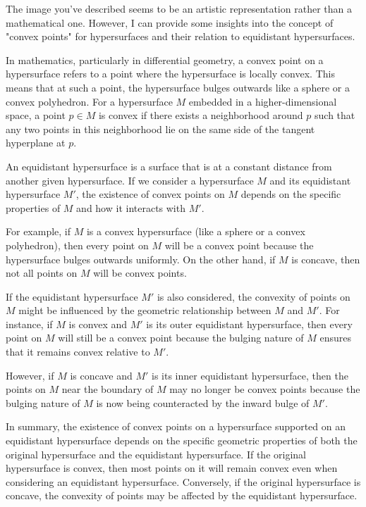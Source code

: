 The image you've described seems to be an artistic representation rather than a mathematical one. However, I can provide some insights into the concept of "convex points" for hypersurfaces and their relation to equidistant hypersurfaces.

In mathematics, particularly in differential geometry, a convex point on a hypersurface refers to a point where the hypersurface is locally convex. This means that at such a point, the hypersurface bulges outwards like a sphere or a convex polyhedron. For a hypersurface \( M \) embedded in a higher-dimensional space, a point \( p \in M \) is convex if there exists a neighborhood around \( p \) such that any two points in this neighborhood lie on the same side of the tangent hyperplane at \( p \).

An equidistant hypersurface is a surface that is at a constant distance from another given hypersurface. If we consider a hypersurface \( M \) and its equidistant hypersurface \( M' \), the existence of convex points on \( M \) depends on the specific properties of \( M \) and how it interacts with \( M' \).

For example, if \( M \) is a convex hypersurface (like a sphere or a convex polyhedron), then every point on \( M \) will be a convex point because the hypersurface bulges outwards uniformly. On the other hand, if \( M \) is concave, then not all points on \( M \) will be convex points.

If the equidistant hypersurface \( M' \) is also considered, the convexity of points on \( M \) might be influenced by the geometric relationship between \( M \) and \( M' \). For instance, if \( M \) is convex and \( M' \) is its outer equidistant hypersurface, then every point on \( M \) will still be a convex point because the bulging nature of \( M \) ensures that it remains convex relative to \( M' \).

However, if \( M \) is concave and \( M' \) is its inner equidistant hypersurface, then the points on \( M \) near the boundary of \( M \) may no longer be convex points because the bulging nature of \( M \) is now being counteracted by the inward bulge of \( M' \).

In summary, the existence of convex points on a hypersurface supported on an equidistant hypersurface depends on the specific geometric properties of both the original hypersurface and the equidistant hypersurface. If the original hypersurface is convex, then most points on it will remain convex even when considering an equidistant hypersurface. Conversely, if the original hypersurface is concave, the convexity of points may be affected by the equidistant hypersurface.